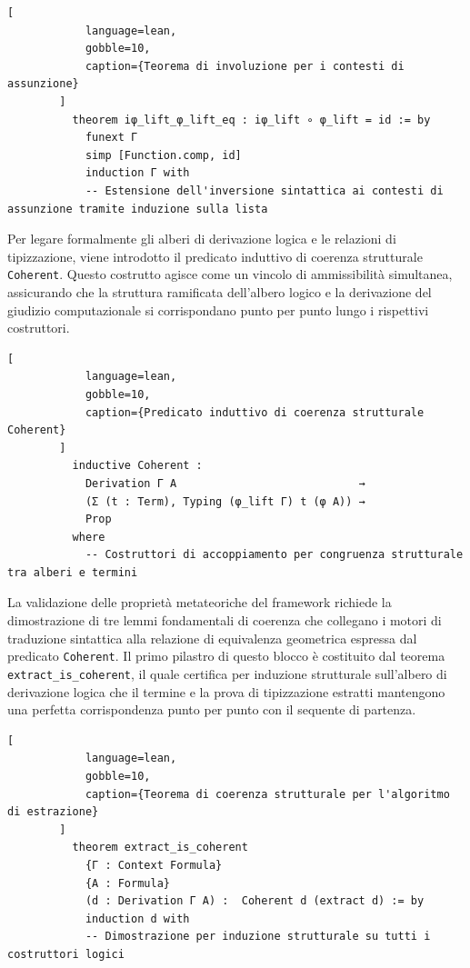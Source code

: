\begin{center}
    \begin{minipage}{\textwidth}
        \begin{lstlisting}[
            language=lean, 
            gobble=10,
            caption={Teorema di involuzione per i contesti di assunzione}
        ]
          theorem iφ_lift_φ_lift_eq : iφ_lift ∘ φ_lift = id := by
            funext Γ
            simp [Function.comp, id]
            induction Γ with
            -- Estensione dell'inversione sintattica ai contesti di assunzione tramite induzione sulla lista
        \end{lstlisting}
    \end{minipage}
\end{center}
Per legare formalmente gli alberi di derivazione logica e le relazioni di tipizzazione, viene introdotto il predicato induttivo di coerenza strutturale \texttt{Coherent}. Questo costrutto agisce come un vincolo di 
ammissibilità simultanea, assicurando che la struttura ramificata dell'albero logico e la derivazione del giudizio computazionale si corrispondano punto per punto lungo i rispettivi costruttori.
\begin{center}
    \begin{minipage}{\textwidth}
        \begin{lstlisting}[
            language=lean, 
            gobble=10,
            caption={Predicato induttivo di coerenza strutturale Coherent}
        ]
          inductive Coherent : 
            Derivation Γ A                            → 
            (Σ (t : Term), Typing (φ_lift Γ) t (φ A)) → 
            Prop 
          where
            -- Costruttori di accoppiamento per congruenza strutturale tra alberi e termini
        \end{lstlisting}
    \end{minipage}
\end{center}
La validazione delle proprietà metateoriche del framework richiede la dimostrazione di tre lemmi fondamentali di coerenza che collegano i motori di traduzione sintattica alla relazione di equivalenza geometrica espressa 
dal predicato \texttt{Coherent}. Il primo pilastro di questo blocco è costituito dal teorema \texttt{extract\_is\_coherent}, il quale certifica per induzione strutturale sull'albero di derivazione logica che il termine e 
la prova di tipizzazione estratti mantengono una perfetta corrispondenza punto per punto con il sequente di partenza.
\begin{center}
    \begin{minipage}{\textwidth}
        \begin{lstlisting}[
            language=lean, 
            gobble=10,
            caption={Teorema di coerenza strutturale per l'algoritmo di estrazione}
        ]
          theorem extract_is_coherent 
            {Γ : Context Formula} 
            {A : Formula}
            (d : Derivation Γ A) :  Coherent d (extract d) := by
            induction d with
            -- Dimostrazione per induzione strutturale su tutti i costruttori logici
        \end{lstlisting}
    \end{minipage}
\end{center}
